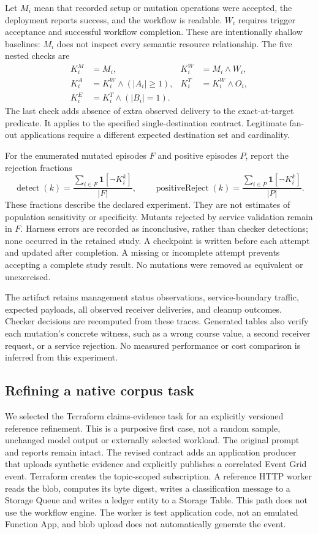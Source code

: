 \documentclass[10pt,a4paper]{article}
\begin{document}
Let $M_i$ mean that recorded setup or mutation operations were accepted, the deployment reports success, and the workflow is readable. $W_i$ requires trigger acceptance and successful workflow completion. These are intentionally shallow baselines: $M_i$ does not inspect every semantic resource relationship. The five nested checks are
\begin{align}
K_i^{M} &= M_i, & K_i^{W} &= M_i\land W_i,\\
K_i^{A} &= K_i^{W}\land(|A_i|\geq 1), & K_i^{T} &= K_i^{W}\land O_i,\\
K_i^{E} &= K_i^{T}\land(|B_i|=1).
\end{align}
The last check adds absence of extra observed delivery to the exact-at-target predicate. It applies to the specified single-destination contract. Legitimate fan-out applications require a different expected destination set and cardinality.

For the enumerated mutated episodes $F$ and positive episodes $P$, report the rejection fractions
\begin{equation}
\operatorname{detect}(k)=\frac{\sum_{i\in F}\mathbf{1}[\neg K_i^k]}{|F|},\qquad
\operatorname{positiveReject}(k)=\frac{\sum_{i\in P}\mathbf{1}[\neg K_i^k]}{|P|}.
\end{equation}
These fractions describe the declared experiment. They are not estimates of population sensitivity or specificity. Mutants rejected by service validation remain in $F$. Harness errors are recorded as inconclusive, rather than checker detections; none occurred in the retained study. A checkpoint is written before each attempt and updated after completion. A missing or incomplete attempt prevents accepting a complete study result. No mutations were removed as equivalent or unexercised.

The artifact retains management status observations, service-boundary traffic, expected payloads, all observed receiver deliveries, and cleanup outcomes. Checker decisions are recomputed from these traces. Generated tables also verify each mutation's concrete witness, such as a wrong course value, a second receiver request, or a service rejection. No measured performance or cost comparison is inferred from this experiment.

\subsection{Refining a native corpus task}
We selected the Terraform claims-evidence task for an explicitly versioned reference refinement. This is a purposive first case, not a random sample, unchanged model output or externally selected workload. The original prompt and reports remain intact. The revised contract adds an application producer that uploads synthetic evidence and explicitly publishes a correlated Event Grid event. Terraform creates the topic-scoped subscription. A reference HTTP worker reads the blob, computes its byte digest, writes a classification message to a Storage Queue and writes a ledger entity to a Storage Table. This path does not use the workflow engine. The worker is test application code, not an emulated Function App, and blob upload does not automatically generate the event.
\end{document}
